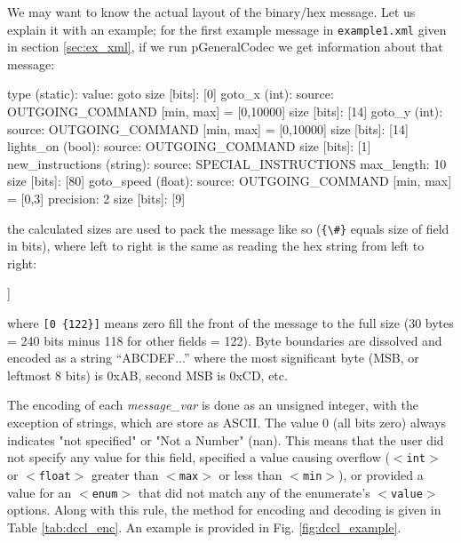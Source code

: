 \documentclass[11pt, letterpaper, oneside]{memoir}
\newcommand{\xmltag}[1]{\texttt{$<$#1$>$}}
\begin{document}
We may want to know the actual layout of the binary/hex message. Let us explain it with an example; for the first example message in \verb|example1.xml| given in section \ref{sec:ex_xml}, if we run pGeneralCodec we get information about that message:
\begin{small}
\begin{boxedverbatim}
        type (static):
                value: {goto}
                size [bits]: [0]
        goto_x (int):
                source: {OUTGOING_COMMAND}
                [min, max] = [0,10000]
                size [bits]: [14]
        goto_y (int):
                source: {OUTGOING_COMMAND}
                [min, max] = [0,10000]
                size [bits]: [14]
        lights_on (bool):
                source: {OUTGOING_COMMAND}
                size [bits]: [1]
        new_instructions (string):
                source: {SPECIAL_INSTRUCTIONS}
                max_length: {10}
                size [bits]: [80]
        goto_speed (float):
                source: {OUTGOING_COMMAND}
                [min, max] = [0,3]
                precision: {2}
                size [bits]: [9]
\end{boxedverbatim}
\resetbvlinenumber
\end{small}
the calculated sizes are used to pack the message like so (\verb|{\#}| equals size of field in bits), where left to right is the same as reading the hex string from left to right:
\begin{small}
\begin{boxedverbatim}
[[0 {122}][goto_x {14}][goto_y {14}][lights_on {1}][new_instructions {80}][goto_speed {9}]]
\end{boxedverbatim}
\resetbvlinenumber
\end{small}
where \verb|[0 {122}]| means zero fill the front of the message to the full size (30 bytes = 240 bits minus 118 for other fields = 122). Byte boundaries are dissolved and encoded as a string ``ABCDEF...'' where the most significant byte (MSB, or leftmost 8 bits) is 0xAB, second MSB is 0xCD, etc. 


The encoding of each \textit{message\_var} is done as an unsigned integer, with the exception of strings, which are store as ASCII. The value 0 (all bits zero) always indicates "not specified" or "Not a Number" (nan). This means that the user did not specify any value for this field, specified a value causing overflow (\xmltag{int} or \xmltag{float} greater than \xmltag{max} or less than \xmltag{min}), or provided a value for an \xmltag{enum} that did not match any of the enumerate's \xmltag{value} options. Along with this rule, the method for encoding and decoding is given in Table \ref{tab:dccl_enc}. An example is provided in Fig. \ref{fig:dccl_example}. 
\end{document}
